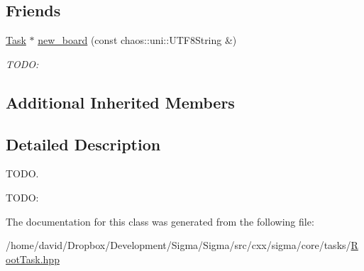\subsection*{Friends}
\begin{DoxyCompactItemize}
\item 
\hypertarget{classsigma_1_1core_1_1tasks_1_1_root_task_ae2299a3ad80e26af78c285a22228df25}{\hyperlink{classsigma_1_1core_1_1tasks_1_1_task}{Task} $\ast$ \hyperlink{classsigma_1_1core_1_1tasks_1_1_root_task_ae2299a3ad80e26af78c285a22228df25}{new\-\_\-board} (const chaos\-::uni\-::\-U\-T\-F8\-String \&)}\label{classsigma_1_1core_1_1tasks_1_1_root_task_ae2299a3ad80e26af78c285a22228df25}

\begin{DoxyCompactList}\small\item\em T\-O\-D\-O\-: \end{DoxyCompactList}\end{DoxyCompactItemize}
\subsection*{Additional Inherited Members}


\subsection{Detailed Description}
T\-O\-D\-O. 

T\-O\-D\-O\-: 

The documentation for this class was generated from the following file\-:\begin{DoxyCompactItemize}
\item 
/home/david/\-Dropbox/\-Development/\-Sigma/\-Sigma/src/cxx/sigma/core/tasks/\hyperlink{_root_task_8hpp}{Root\-Task.\-hpp}\end{DoxyCompactItemize}
